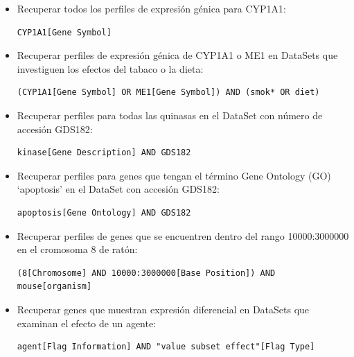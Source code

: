 \begin{itemize}
    \item Recuperar todos los perfiles de expresión génica para CYP1A1:
    \begin{lstlisting}[basicstyle=\ttfamily\small, backgroundcolor=\color{lightgray}, numbers=none, aboveskip=0pt, belowskip=0pt]
CYP1A1[Gene Symbol]\end{lstlisting}

    \item Recuperar perfiles de expresión génica de CYP1A1 o ME1 en DataSets que investiguen los efectos del tabaco o la dieta:
    \begin{lstlisting}[basicstyle=\ttfamily\small, backgroundcolor=\color{lightgray}, numbers=none, aboveskip=0pt, belowskip=0pt]
(CYP1A1[Gene Symbol] OR ME1[Gene Symbol]) AND (smok* OR diet)\end{lstlisting}

    \item Recuperar perfiles para todas las quinasas en el DataSet con número de accesión GDS182:
    \begin{lstlisting}[basicstyle=\ttfamily\small, backgroundcolor=\color{lightgray}, numbers=none, aboveskip=0pt, belowskip=0pt]
kinase[Gene Description] AND GDS182\end{lstlisting}

    \item Recuperar perfiles para genes que tengan el término Gene Ontology (GO) ‘apoptosis’ en el DataSet con accesión GDS182:
    \begin{lstlisting}[basicstyle=\ttfamily\small, backgroundcolor=\color{lightgray}, numbers=none, aboveskip=0pt, belowskip=0pt]
apoptosis[Gene Ontology] AND GDS182\end{lstlisting}

    \item Recuperar perfiles de genes que se encuentren dentro del rango 10000:3000000 en el cromosoma 8 de ratón:
    \begin{lstlisting}[basicstyle=\ttfamily\small, backgroundcolor=\color{lightgray}, numbers=none, aboveskip=0pt, belowskip=0pt]
(8[Chromosome] AND 10000:3000000[Base Position]) AND mouse[organism]\end{lstlisting}

    \item Recuperar genes que muestran expresión diferencial en DataSets que examinan el efecto de un agente:
    \begin{lstlisting}[basicstyle=\ttfamily\small, backgroundcolor=\color{lightgray}, numbers=none, aboveskip=0pt, belowskip=0pt]
agent[Flag Information] AND "value subset effect"[Flag Type]\end{lstlisting}
\end{itemize}


